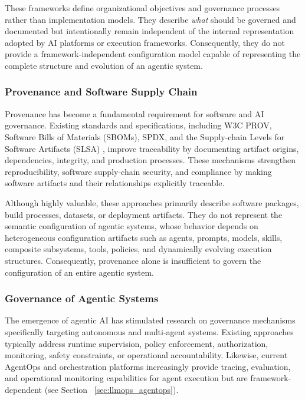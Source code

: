 \documentclass[10pt]{article}
\begin{document}
These frameworks define organizational objectives and governance processes rather than implementation models. They describe \emph{what} should be governed and documented but intentionally remain independent of the internal representation adopted by AI platforms or execution frameworks. Consequently, they do not provide a framework-independent configuration model capable of representing the complete structure and evolution of an agentic system.

\subsubsection{Provenance and Software Supply Chain}
\label{sec:provenance_supply_chain}

Provenance has become a fundamental requirement for software and AI governance. Existing standards and specifications, including W3C PROV, Software Bills of Materials (SBOMs), SPDX, and the Supply-chain Levels for Software Artifacts (SLSA) \cite{missier2013w3c, SBOM10336262, stewart2010software, okafor2022sok, cobbe2023understanding}, improve traceability by documenting artifact origins, dependencies, integrity, and production processes. These mechanisms strengthen reproducibility, software supply-chain security, and compliance by making software artifacts and their relationships explicitly traceable.

Although highly valuable, these approaches primarily describe software packages, build processes, datasets, or deployment artifacts. They do not represent the semantic configuration of agentic systems, whose behavior depends on heterogeneous configuration artifacts such as agents, prompts, models, skills, composite subsystems, tools, policies, and dynamically evolving execution structures. Consequently, provenance alone is insufficient to govern the configuration of an entire agentic system.

\subsubsection{Governance of Agentic Systems}
\label{sec:agentic_governance}

The emergence of agentic AI has stimulated research on governance mechanisms specifically targeting autonomous and multi-agent systems. Existing approaches typically address runtime supervision, policy enforcement, authorization, monitoring, safety constraints, or operational accountability. Likewise, current AgentOps and orchestration platforms increasingly provide tracing, evaluation, and operational monitoring capabilities for agent execution but are framework-dependent (see Section ~\ref{sec:llmops_agentops}).
\end{document}
